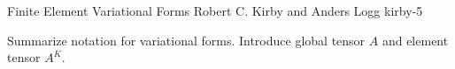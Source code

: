               {Finite Element Variational Forms}
              {Robert C. Kirby and Anders Logg}
              {kirby-5}

Summarize notation for variational forms. Introduce global tensor $A$
and element tensor $A^K$.
